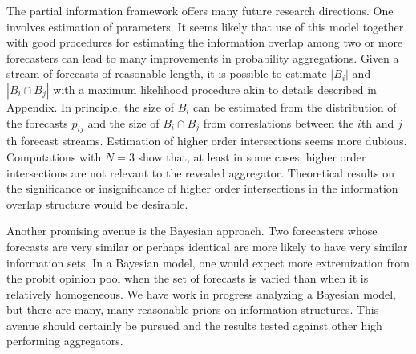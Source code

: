 \documentclass[11pt]{article}
\theoremstyle{definition}
\theoremstyle{definition}
\begin{document}

The partial information framework offers many future research directions. 
One involves estimation of parameters.  It seems likely that use of
this model together with good procedures for estimating the information
overlap among two or more forecasters can lead to many improvements in probability aggregations. Given a stream of forecasts of reasonable length, it is possible to estimate $|B_i|$ and $|B_i \cap B_j|$ with a maximum likelihood procedure akin to details described in Appendix. In principle, the size of $B_i$ can be estimated from 
the distribution of the forecasts $p_{ij}$ and the size of 
$B_i \cap B_j$ from correslations between the $i$th and $j$th 
forecast streams.  Estimation of higher order intersections seems
more dubious.  Computations with $N=3$ show that, at least in some
cases, higher order intersections are not relevant to the
revealed aggregator.  Theoretical results on the significance or 
insignificance of higher order intersections in the information 
overlap structure would be desirable.

Another promising avenue is the Bayesian approach.  Two forecasters
whose forecasts are very similar or perhaps identical are more
likely to have very similar information sets.  In a Bayesian model,
one would expect more extremization from the probit opinion pool
when the set of forecasts is varied than when it is relatively
homogeneous.  We have work in progress analyzing a Bayesian model, but there are many, many reasonable priors 
on information structures.  This avenue should certainly be 
pursued and the results tested against other high performing 
aggregators.
\end{document}
